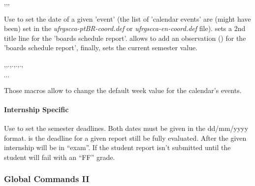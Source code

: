 \documentclass[article,nogeometry,english,tocdepth=3,secdepth=3]{ufrgscca} %
\begin{document}
\begin{codedescribe}{\tcccalendareventdate,\boardstitleB,\boardsOBS,\TCCperiod}
	\begin{codesyntax}%
	\end{codesyntax}
Use \tsmacro{\tcccalendareventdate}{} to set the date of a given 'event' (the list of 'calendar events' are (might have been) set in the \emph{ufrgscca-ptBR-coord.def} or \emph{ufrgscca-en-coord.def} file).  sets a 2nd title line for the 'boards schedule report'. \tsmacro{\boardsOBS}{} allows to add an observation () for the 'boards schedule report', finally, \tsmacro{\TCCperiod} sets the current semester value.
\end{codedescribe}

\begin{codedescribe}{\tcceventAweek,\tcceventBweek,.,.,.,.,\tcceventJweek}
    \begin{codesyntax}%
        \ensuremath{\cdots}
    \end{codesyntax}
    Those macros allow to change the default week value for the calendar's events.
\end{codedescribe}

\paragraph{Internship Specific}

\begin{codedescribe}{\intershipcommitdates}
    \begin{codesyntax}%
    \end{codesyntax}
    Use \tsmacro{\intershipcommitdates}{} to set the semester deadlines. Both dates must be given in the dd/mm/yyyy format.
     is the deadline for a given report still be fully evaluated. After  the given internship will be in “exam”. If the student report isn't submitted until  the student will fail with an “FF” grade.
\end{codedescribe}



\subsubsection{Global Commands II}\label{new-student}
\end{document}
